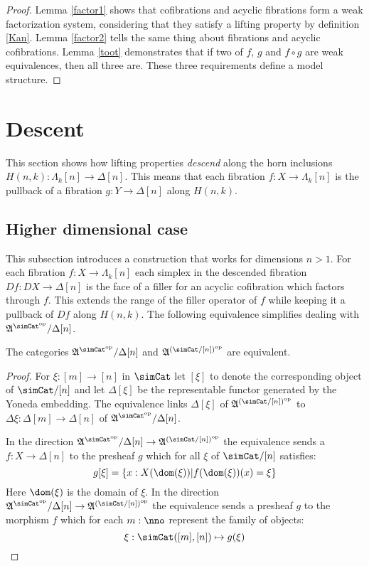 \documentclass{tac}
\newcommand\hide[1]{}
\newcommand\set[1]{\left\{#1\right\}}
\newcommand\dual{^{\mathrm{op}}}
\newcommand\s{^{\simCat\dual}}
\newcommand\of{:}
\newcommand\simplex\Delta
\newcommand\horn\Lambda
\newcommand\ambient{\mathfrak A}
\begin{document}
\begin{proof}
Lemma \ref{factor1} shows that cofibrations and acyclic fibrations form a weak factorization system, considering that they satisfy a lifting property by definition \ref{Kan}. Lemma \ref{factor2} tells the same thing about fibrations and acyclic cofibrations. Lemma \ref{toot} demonstrates that if two of $f$, $g$ and $f\circ g$ are weak equivalences, then all three are. These three requirements define a model structure.
\end{proof}

\section{Descent} \hide{Does this belong here, or in a seperate paper?}
This section shows how lifting properties \emph{descend} along the horn inclusions $H(n,k)\of \horn_k[n]\to\simplex[n]$. This means that each fibration $f\of X\to\horn_k[n]$ is the pullback of a fibration $g\of Y\to\simplex[n]$ along $H(n,k)$.

\subsection{Higher dimensional case}
This subsection introduces a construction that works for dimensions $n>1$. For each fibration $f\of X\to \horn_k[n]$ each simplex in the descended fibration $Df\of DX\to \simplex[n]$ is the face of a filler for an acyclic cofibration which factors through $f$. This extends the range of the filler operator of $f$ while keeping it a pullback of $Df$ along $H(n,k)$. The following equivalence simplifies dealing with $\ambient\s/\simplex[n]$.

\hide{ this bit scares me. Has it actually gotten harder though? }
\begin{lemma} The categories $\ambient\s/\simplex[n]$ and $\ambient^{(\simCat/[n])\dual}$ are equivalent. \label{slice equivalence} \end{lemma}

\begin{proof} For $\xi\of[m]\to[n]$ in $\simCat$ let $[\xi]$ to denote the corresponding object of $\simCat/[n]$ and let $\simplex[\xi]$ be the representable functor generated by the Yoneda embedding. The equivalence links $\simplex[\xi]$ of $\ambient^{(\simCat/[n])\dual}$ to $\Delta\xi\of \simplex[m]\to \simplex[n]$ of $\ambient\s/\simplex[n]$.

In the direction $\ambient\s/\simplex[n]\to \ambient^{(\simCat/[n])\dual}$ the equivalence sends a $f\of X\to \simplex[n]$ to the presheaf $g$ which for all $\xi$ of $\simCat/[n]$ satisfies:
\[ g[\xi] = \set{ x\of X(\dom(\xi)) | f(\dom(\xi))(x)=\xi } \]
Here $\dom(\xi)$ is the domain of $\xi$.
In the direction $\ambient\s/\simplex[n]\to \ambient^{(\simCat/[n])\dual}$ the equivalence sends a presheaf $g$ to the morphism $f$ which for each $m\of\nno$ represent the family of objects:
\[ \xi\of\simCat([m],[n])\mapsto g(\xi) \]
\end{proof}
\end{document}
